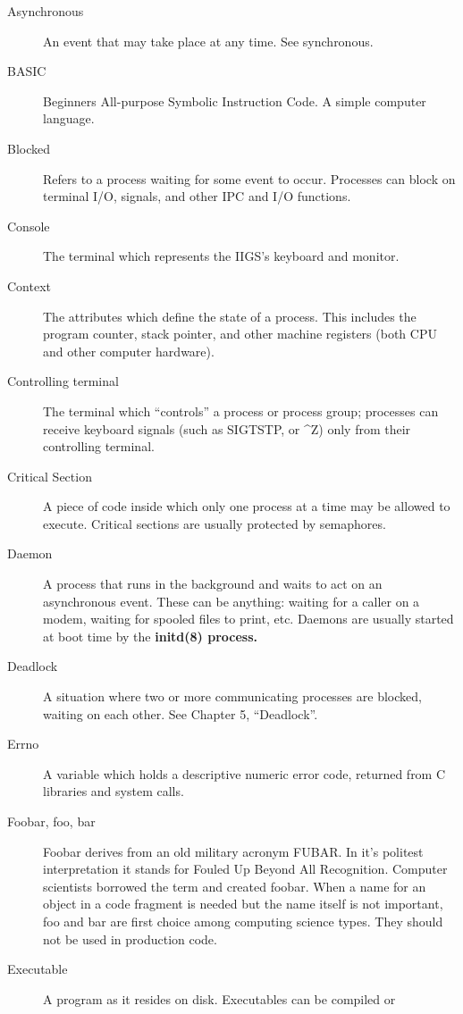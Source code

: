 \documentclass{report}
\begin{document}
\begin{description}
\item[Asynchronous]
	An event that may take place at any time. See synchronous.
\item[BASIC]
	Beginners All-purpose Symbolic Instruction Code. A simple computer
	language.
\item[Blocked]
	Refers to a process waiting for some event to occur. Processes can
	block on terminal I/O, signals, and other IPC and I/O functions.
\item[Console]
	The terminal which represents the IIGS's keyboard and monitor.
\item[Context]
	The attributes which  define the state of a process. This includes
	the program counter, stack pointer, and other machine registers (both
	CPU and other computer hardware).
\item[Controlling terminal]
	The terminal which ``controls'' a process or process group;
	processes can receive keyboard signals (such as SIGTSTP, or 
	 \^{}Z)
	only from their controlling terminal.
\item[Critical Section]
	A piece of code inside which only one process at a time may
	be allowed to execute. Critical sections are usually protected by
	semaphores.
\item[Daemon]
	A process that runs in the  background and
	waits to act on an
	asynchronous event. These can be anything: waiting for a caller
	on a modem, waiting for spooled files to print, etc. Daemons
	are usually started at boot time by the \bf initd\rm(8)
	process.
\item[Deadlock]
	A situation where two or more communicating processes are blocked,
	waiting on each other. See Chapter 5, ``Deadlock''.
\item[Errno]
	A variable which holds a descriptive numeric error code,
	returned from C libraries and system calls.
\item[Foobar, foo, bar]
	Foobar derives from an old military acronym FUBAR. In it's politest
	interpretation it stands for Fouled Up Beyond All Recognition.
	Computer scientists borrowed the term and created foobar.
	When a name for an object in a code fragment is needed but the
	name itself is not important, foo and bar are first choice among
	computing science types.  They should not be used in production
	code.
\item[Executable]
	A program as it resides on disk. Executables can be compiled or

\end{description}
\end{document}
